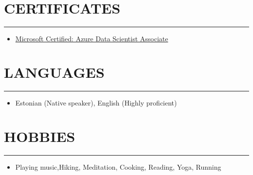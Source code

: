\documentclass[a4paper,10pt]{article}
\newcommand{\cvsection}[1]{\section*{\MakeUppercase{#1}}\hrule\vspace{0.5em}}
\begin{document}
\cvsection{Certificates}
\begin{itemize}[leftmargin=*]
    \item\href{https://learn.microsoft.com/en-us/users/hendrikparik-5080/credentials/3222fde6c495fb07}{Microsoft Certified: Azure Data Scientist Associate} 
\end{itemize}



\cvsection{Languages}
\begin{itemize}[leftmargin=*]
    \item Estonian (Native speaker), English (Highly proficient)
\end{itemize}

\cvsection{Hobbies}
\begin{itemize}[leftmargin=*]
    \item Playing music,Hiking, Meditation, Cooking, Reading, Yoga, Running
\end{itemize}
\end{document}
